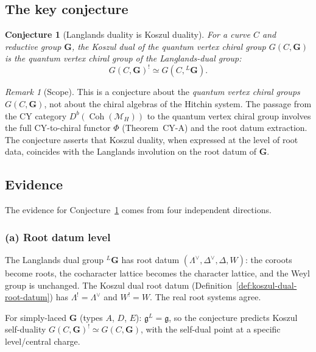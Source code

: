 \documentclass[11pt]{article}
\newtheorem{conjecture}[theorem]{Conjecture}
\theoremstyle{definition}
\theoremstyle{remark}
\newtheorem{remark}[theorem]{Remark}
\DeclareMathOperator{\Coh}{Coh}
\newcommand{\fkg}{\mathfrak{g}}
\newcommand{\cM}{\mathcal{M}}
\begin{document}
\subsection{The key conjecture}

\begin{conjecture}[Langlands duality is Koszul duality]
\label{conj:langlands-koszul}
For a curve $C$ and reductive group $\mathbf{G}$, the Koszul dual
of the quantum vertex chiral group $G(C, \mathbf{G})$ is the
quantum vertex chiral group of the Langlands-dual group:
\begin{equation}\label{eq:langlands-koszul}
\boxed{G(C, \mathbf{G})^! \simeq G(C, {}^L\mathbf{G}).}
\end{equation}
\end{conjecture}

\begin{remark}[Scope]
This is a conjecture about the \emph{quantum vertex chiral groups}
$G(C, \mathbf{G})$, not about the chiral algebras of the Hitchin system.
The passage from the CY category $D^b(\Coh(\cM_H))$ to the quantum
vertex chiral group involves the full CY-to-chiral functor $\Phi$
(Theorem~CY-A) and the root datum extraction. The conjecture asserts
that Koszul duality, when expressed at the level of root data,
coincides with the Langlands involution on the root datum of
$\mathbf{G}$.
\end{remark}

\subsection{Evidence}

The evidence for Conjecture~\ref{conj:langlands-koszul} comes from
four independent directions.

\subsubsection{(a) Root datum level}
The Langlands dual group ${}^L\mathbf{G}$ has root datum
$(\Lambda^\vee, \Delta^\vee, \Delta, W)$: the coroots become
roots, the cocharacter lattice becomes the character lattice, and the
Weyl group is unchanged. The Koszul dual root datum
(Definition~\ref{def:koszul-dual-root-datum}) has
$\Lambda^! = \Lambda^\vee$ and $W^! = W$. The real root systems agree.

For simply-laced $\mathbf{G}$ (types $A$, $D$, $E$): $\fkg^L = \fkg$,
so the conjecture predicts Koszul self-duality
$G(C, \mathbf{G})^! \simeq G(C, \mathbf{G})$, with the self-dual
point at a specific level/central charge.
\end{document}
